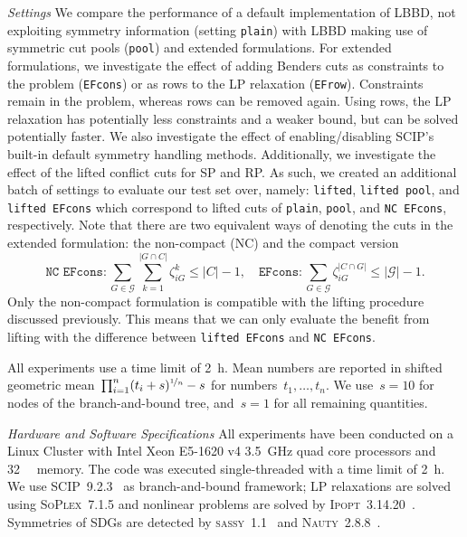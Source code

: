 \documentclass[a4paper,10pt]{article}
\newcommand{\solver}[1]{\textsc{#1}}
\newcommand{\scip}{\solver{SCIP}\xspace}
\newcommand{\setting}[1]{\texttt{#1}}
\newcommand{\rectanglepack}{RP\xspace}
\newcommand{\spherepack}{SP\xspace}
\theoremstyle{definition}
\begin{document}
\medskip
\noindent\emph{Settings}
We compare the performance of a default implementation of LBBD, not exploiting symmetry information (setting \setting{plain}) with LBBD making use of symmetric cut pools (\setting{pool}) and extended formulations.
For extended formulations, we investigate the effect of adding Benders cuts as constraints to the problem (\setting{EFcons}) or as rows to the LP relaxation (\setting{EFrow}).
Constraints remain in the problem, whereas rows can be removed again.
Using rows, the LP relaxation has potentially less constraints and a weaker bound, but can be solved potentially faster.
We also investigate the effect of enabling/disabling \scip's built-in default symmetry handling methods.
Additionally, we investigate the effect of the lifted conflict cuts for \spherepack and \rectanglepack.
As such, we created an additional batch of settings to evaluate our test set over, namely: \setting{lifted}, \setting{lifted pool}, and \setting{lifted EFcons} which correspond to lifted cuts of \setting{plain}, \setting{pool}, and \setting{NC EFcons}, respectively.
Note that there are two equivalent ways of denoting the cuts in the extended formulation: the non-compact (NC) and the compact version
\begin{equation}
  \label{eq:non-compact-vs-compact}
  \setting{NC EFcons}: \sum_{G\in\mathcal{G}} \sum_{k = 1}^{|G\cap C|} \zeta_{iG}^k \leq |C| - 1, \quad
  \setting{EFcons}: \sum_{G\in \mathcal{G}} \zeta_{iG}^{|C\cap G|} \leq |\mathcal{G}| -1.
\end{equation}
Only the non-compact formulation is compatible with the lifting procedure discussed previously.
This means that we can only evaluate the benefit from lifting with the difference between \setting{lifted EFcons} and \setting{NC EFcons}.

All experiments use a time limit of \SI{2}{\hour}.
Mean numbers are reported in shifted geometric mean~$\prod_{i=1}^n (t_i + s)^{\nicefrac{1}{n}} - s$ for numbers~$t_1,\dots,t_n$.
We use~$s=10$ for nodes of the branch-and-bound tree, and~$s=1$ for all remaining quantities.

\medskip
\noindent\emph{Hardware and Software Specifications}
\label{app:hardware}
All experiments have been conducted on a Linux Cluster with Intel Xeon E5-1620 v4 \SI{3.5}{\giga\hertz} quad core processors and \SI{32}{\giga\byte} memory.
The code was executed single-threaded with a time limit of \SI{2}{\hour}.
We use \scip~9.2.3~\cite{SCIP9} as branch-and-bound framework; LP relaxations are solved using \solver{SoPlex}~7.1.5 and nonlinear problems are solved by \solver{Ipopt}~3.14.20~\cite{WachterBiegler2006}.
Symmetries of SDGs are detected by \solver{sassy}~1.1~\cite{AndersEtAl2023} and \solver{Nauty}~2.8.8~\cite{Nauty}.
\end{document}

